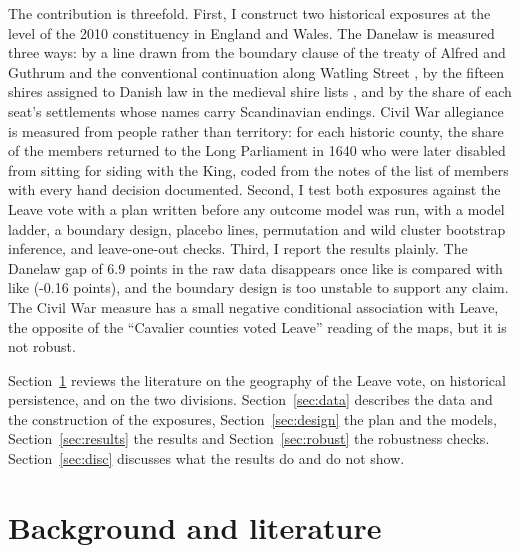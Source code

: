 \documentclass[11pt,a4paper]{article}
\begin{document}
The contribution is threefold. First, I construct two historical exposures at the level of the 2010 constituency in England and Wales. The Danelaw is measured three ways: by a line drawn from the boundary clause of the treaty of Alfred and Guthrum and the conventional continuation along Watling Street \citep{davis1982,dumville1992}, by the fifteen shires assigned to Danish law in the medieval shire lists \citep{downer1972,wikithreefold}, and by the share of each seat's settlements whose names carry Scandinavian endings. Civil War allegiance is measured from people rather than territory: for each historic county, the share of the members returned to the Long Parliament in 1640 who were later disabled from sitting for siding with the King, coded from the notes of the list of members \citep{wiki1640} with every hand decision documented. Second, I test both exposures against the Leave vote with a plan written before any outcome model was run, with a model ladder, a boundary design, placebo lines, permutation and wild cluster bootstrap inference, and leave-one-out checks. Third, I report the results plainly. The Danelaw gap of 6.9 points in the raw data disappears once like is compared with like (-0.16 points), and the boundary design is too unstable to support any claim. The Civil War measure has a small negative conditional association with Leave, the opposite of the ``Cavalier counties voted Leave'' reading of the maps, but it is not robust.

Section~\ref{sec:lit} reviews the literature on the geography of the Leave vote, on historical persistence, and on the two divisions. Section~\ref{sec:data} describes the data and the construction of the exposures, Section~\ref{sec:design} the plan and the models, Section~\ref{sec:results} the results and Section~\ref{sec:robust} the robustness checks. Section~\ref{sec:disc} discusses what the results do and do not show.

\section{Background and literature}\label{sec:lit}
\end{document}
